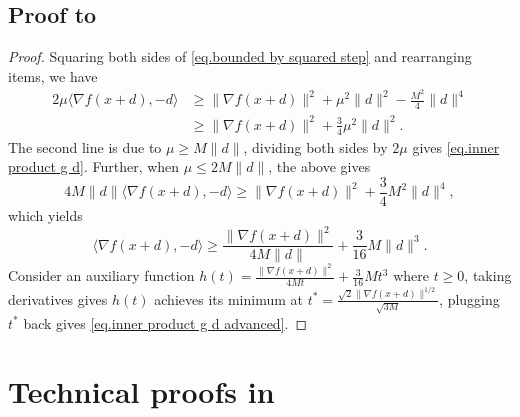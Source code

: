 \documentclass{article}
\numberwithin{equation}{section}
\numberwithin{equation}{section}
\begin{document}
\subsection*{Proof to~}
\begin{proof}
    Squaring both sides of \eqref{eq.bounded by squared step} and rearranging items, we have
    \begin{equation*}
        \begin{aligned}
            2\mu \langle \nabla f(x+d),-d \rangle & \geq \|\nabla f(x+d)\|^2 +\mu^2 \|d\|^2 -\frac{M^2}{4}\|d\|^4 \\
                                                  & \geq \|\nabla f(x+d)\|^2 +\frac{3}{4}\mu^2 \|d\|^2.
        \end{aligned}
    \end{equation*}
    The second line is due to $\mu\geq M\|d\|$, dividing both sides by $2\mu$ gives \eqref{eq.inner product g d}. Further, when $\mu \leq 2M\|d\|$, the above gives
    \begin{equation*}
        4M\|d\| \langle \nabla f(x+d),-d \rangle \geq \|\nabla f(x+d)\|^2 +\frac{3}{4} M^2 \|d\|^4,
    \end{equation*}
    which yields
    \begin{equation*}
        \langle \nabla f(x+d),-d \rangle \geq \frac{\|\nabla f(x+d)\|^2}{4M\|d\|}+\frac{3}{16}M\|d\|^3.
    \end{equation*}
    Consider an auxiliary function $h(t) = \frac{\|\nabla f(x+d)\|^2}{4Mt}+\frac{3}{16}Mt^3$ where $t\geq 0$, taking derivatives gives $h(t)$ achieves its minimum at $t^*= \frac{\sqrt{2}\|\nabla f(x+d)\|^{1/2}}{\sqrt{3M}}$, plugging $t^*$ back gives \eqref{eq.inner product g d advanced}.
\end{proof}
\section{Technical proofs in~}\label{sec.proof variant 1}
\end{document}
